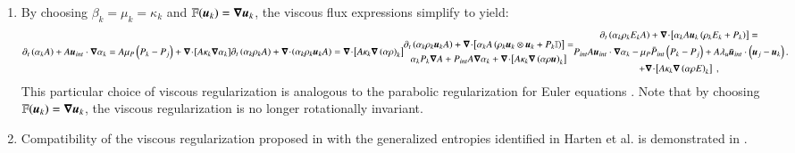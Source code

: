 \documentclass[preprint,10pt]{elsarticle}
\begin{document}
\begin{enumerate}
\item{By choosing $\beta_k = \mu_k = \kappa_k$ and $\mathbb{F}(\boldsymbol u_k) = \boldsymbol\nabla \boldsymbol u_k$, the viscous flux expressions simplify to yield: 
\begin{subequations}\label{eq:sev_equ-parab}
\begin{align}\label{eq:sev_equ-parab-vf}
\partial_t \left( \alpha_k  A\right) + A \mbold u_{int} \cdot \grad \alpha_k = A \mu_P \left( P_k - P_j \right) + \div \left[ A \kappa_k \grad \alpha_k \right]
\end{align}
\begin{align}\label{eq:sev_equ-parab-cont}
\partial_t \left( \alpha_k \rho_k A \right) + \div \left( \alpha_k \rho_k \mbold u_k A \right) = \div \left[ A \kappa_k \grad \left( \alpha \rho \right)_k \right]
\end{align}
\begin{multline}\label{eq:sev_equ-parab-mom}
\partial_t \left( \alpha_k \rho_k \mbold u_k A \right) + \div \left[ \alpha_k A \left( \rho_k \mbold u_k \otimes \mbold u_k + P_k \mathbb{I} \right) \right] = \\
\alpha_k P_k \grad A + P_{int} A \grad \alpha_k + \div \left[ A \kappa_k \grad \left( \alpha \rho \mbold u  \right)_k \right] 
\end{multline}
\begin{multline}\label{eq:sev_equ-parab-ener}
\partial_t \left( \alpha_k \rho_k E_k A \right) + \div \left[ \alpha_k A \mbold u_k \left( \rho_k E_k + P_k \right) \right] = \\
P_{int} A \mbold u_{int} \cdot \grad \alpha_k -
\mu_P \bar{P}_{int} \left( P_k-P_j \right) + 
A \lambda_u \bar{\mbold u}_{int} \cdot \left( \mbold u_j - \mbold u_k \right)  \\
+ \div \left[A \kappa_k \grad \left( \alpha \rho E \right)_k \right] \ ,
\end{multline} \,.
\end{subequations}
This particular choice of viscous regularization is analogous to the parabolic regularization for Euler equations \cite{Parabolic}. Note that by choosing $\mathbb{F}(\boldsymbol u_k) = \boldsymbol\nabla \boldsymbol u_k$, the viscous regularization is no longer rotationally invariant.
}
    
\item{Compatibility of the viscous regularization proposed in  with the generalized entropies identified in Harten et al. \cite{Harten} is demonstrated in . } 

  
\end{enumerate}
\end{document}
